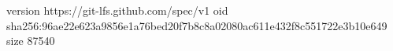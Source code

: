 version https://git-lfs.github.com/spec/v1
oid sha256:96ae22e623a9856e1a76bed20f7b8c8a02080ac611e432f8c551722e3b10e649
size 87540
